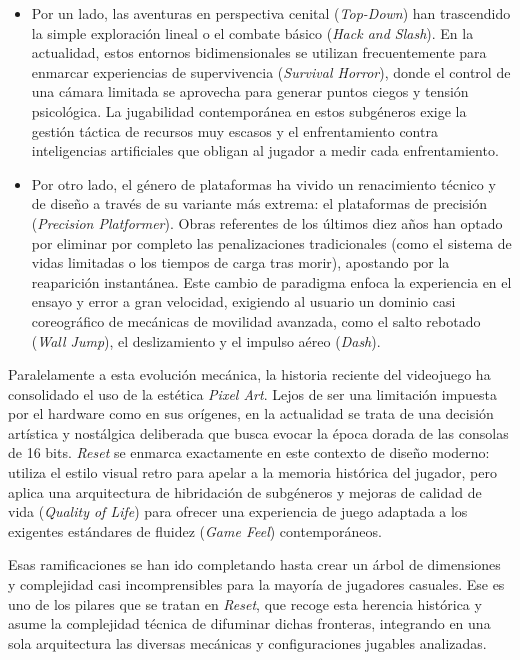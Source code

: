 \begin{itemize}
    \item Por un lado, las aventuras en perspectiva cenital (\textit{Top-Down}) han trascendido la simple exploración lineal o el combate básico (\textit{Hack and Slash}). En la actualidad, estos entornos bidimensionales se utilizan frecuentemente para enmarcar experiencias de supervivencia (\textit{Survival Horror}), donde el control de una cámara limitada se aprovecha para generar puntos ciegos y tensión psicológica. La jugabilidad contemporánea en estos subgéneros exige la gestión táctica de recursos muy escasos y el enfrentamiento contra inteligencias artificiales que obligan al jugador a medir cada enfrentamiento.
    \item Por otro lado, el género de plataformas ha vivido un renacimiento técnico y de diseño a través de su variante más extrema: el plataformas de precisión (\textit{Precision Platformer}). Obras referentes de los últimos diez años han optado por eliminar por completo las penalizaciones tradicionales (como el sistema de vidas limitadas o los tiempos de carga tras morir), apostando por la reaparición instantánea. Este cambio de paradigma enfoca la experiencia en el ensayo y error a gran velocidad, exigiendo al usuario un dominio casi coreográfico de mecánicas de movilidad avanzada, como el salto rebotado (\textit{Wall Jump}), el deslizamiento y el impulso aéreo (\textit{Dash}).
\end{itemize}

Paralelamente a esta evolución mecánica, la historia reciente del videojuego ha consolidado el uso de la estética \textit{Pixel Art}. Lejos de ser una limitación impuesta por el hardware como en sus orígenes, en la actualidad se trata de una decisión artística y nostálgica deliberada que busca evocar la época dorada de las consolas de 16 bits. \textit{Reset} se enmarca exactamente en este contexto de diseño moderno: utiliza el estilo visual retro para apelar a la memoria histórica del jugador, pero aplica una arquitectura de hibridación de subgéneros y mejoras de calidad de vida (\textit{Quality of Life}) para ofrecer una experiencia de juego adaptada a los exigentes estándares de fluidez (\textit{Game Feel}) contemporáneos.

Esas ramificaciones se han ido completando hasta crear un árbol de dimensiones y complejidad casi incomprensibles para la mayoría de jugadores casuales. Ese es uno de los pilares que se tratan en \textit{Reset}, que recoge esta herencia histórica y asume la complejidad técnica de difuminar dichas fronteras, integrando en una sola arquitectura las diversas mecánicas y configuraciones jugables analizadas.

